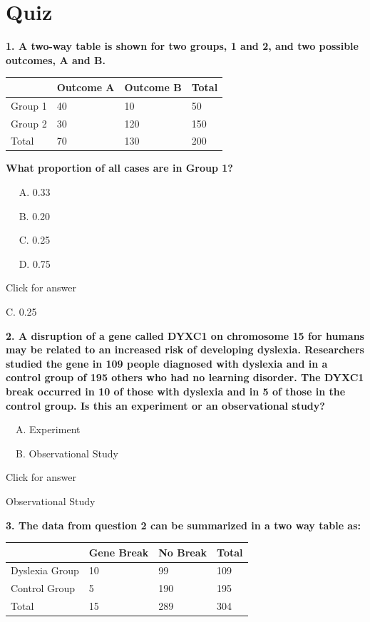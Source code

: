 \documentclass[
]{book}
\begin{document}
\hypertarget{quiz-3}{%
\section{Quiz}\label{quiz-3}}

\textbf{1. A two-way table is shown for two groups, 1 and 2, and two possible outcomes, A and B.}

\begin{longtable}[]{@{}llll@{}}
\toprule()
~ & Outcome A & Outcome B & Total \\
\midrule()
\endhead
Group 1 & 40 & 10 & 50 \\
Group 2 & 30 & 120 & 150 \\
Total & 70 & 130 & 200 \\
\bottomrule()
\end{longtable}

\textbf{What proportion of all cases are in Group 1?}

  A. 0.33

  B. 0.20

  C. 0.25

  D. 0.75

Click for answer

C. 0.25

\textbf{2. A disruption of a gene called DYXC1 on chromosome 15 for humans may be related to an increased risk of developing dyslexia. Researchers studied the gene in 109 people diagnosed with dyslexia and in a control group of 195 others who had no learning disorder. The DYXC1 break occurred in 10 of those with dyslexia and in 5 of those in the control group. Is this an experiment or an observational study?}

 A. Experiment

 B. Observational Study

Click for answer

Observational Study

\textbf{3. The data from question 2 can be summarized in a two way table as:}

\begin{longtable}[]{@{}llll@{}}
\toprule()
~ & Gene Break & No Break & Total \\
\midrule()
\endhead
Dyslexia Group & 10 & 99 & 109 \\
Control Group & 5 & 190 & 195 \\
Total & 15 & 289 & 304 \\
\bottomrule()
\end{longtable}
\end{document}
